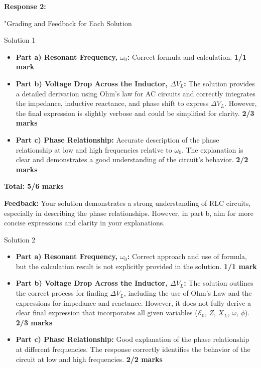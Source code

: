 \documentclass[a4paper,11pt]{article}
\begin{document}
\textbf{Response 2:}

"Grading and Feedback for Each Solution

Solution 1

\begin{itemize}
    \item \textbf{Part a) Resonant Frequency, \( \omega_{0} \):} Correct formula and calculation. \textbf{1/1 mark}
    \item \textbf{Part b) Voltage Drop Across the Inductor, \( \Delta V_{L} \):} The solution provides a detailed derivation using Ohm's law for AC circuits and correctly integrates the impedance, inductive reactance, and phase shift to express \( \Delta V_{L} \). However, the final expression is slightly verbose and could be simplified for clarity. \textbf{2/3 marks}
    \item \textbf{Part c) Phase Relationship:} Accurate description of the phase relationship at low and high frequencies relative to \( \omega_{0} \). The explanation is clear and demonstrates a good understanding of the circuit's behavior. \textbf{2/2 marks}
\end{itemize}

\textbf{Total: 5/6 marks}

\textbf{Feedback:} Your solution demonstrates a strong understanding of RLC circuits, especially in describing the phase relationships. However, in part b, aim for more concise expressions and clarity in your explanations.

Solution 2

\begin{itemize}
    \item \textbf{Part a) Resonant Frequency, \( \omega_{0} \):} Correct approach and use of formula, but the calculation result is not explicitly provided in the solution. \textbf{1/1 mark}
    \item \textbf{Part b) Voltage Drop Across the Inductor, \( \Delta V_{L} \):} The solution outlines the correct process for finding \( \Delta V_{L} \), including the use of Ohm's Law and the expressions for impedance and reactance. However, it does not fully derive a clear final expression that incorporates all given variables (\( \mathcal{E}_{0} \), \(Z\), \(X_{L}\), \( \omega \), \( \phi \)). \textbf{2/3 marks}
    \item \textbf{Part c) Phase Relationship:} Good explanation of the phase relationship at different frequencies. The response correctly identifies the behavior of the circuit at low and high frequencies. \textbf{2/2 marks}
\end{itemize}
\end{document}
